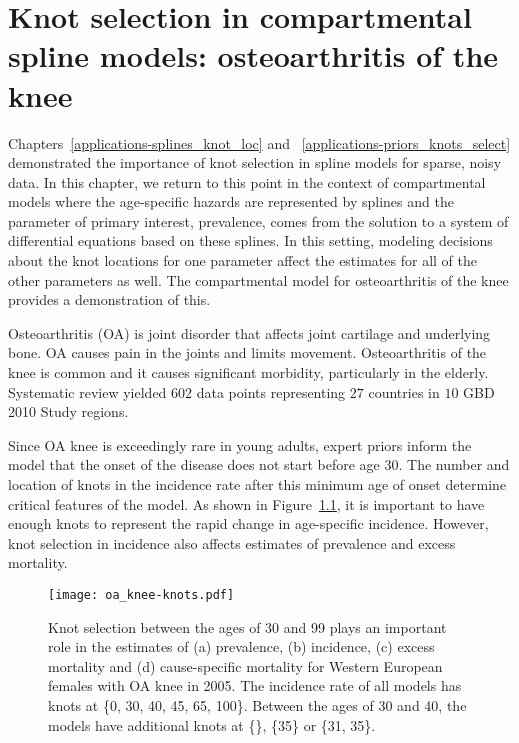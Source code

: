 \chapter{Knot selection in compartmental spline models: osteoarthritis of the knee}
\label{applications-con_fit_splines}

Chapters~\ref{applications-splines_knot_loc} and
~\ref{applications-priors_knots_select} demonstrated the importance of
knot selection in spline models for sparse, noisy data. In this
chapter, we return to this point in the context of compartmental
models where the age-specific hazards are represented by splines and
the parameter of primary interest, prevalence, comes from the solution
to a system of differential equations based on these splines. In this
setting, modeling decisions about the knot locations for one parameter
affect the estimates for all of the other parameters as well.  The
compartmental model for osteoarthritis of the knee provides a
demonstration of this.

Osteoarthritis (OA) is joint disorder that affects joint cartilage and
underlying bone.  OA causes pain in the joints and limits movement.
Osteoarthritis of the knee is common and it causes significant
morbidity, particularly in the
elderly. \cite{felson_epidemiology_1988, felson_incidence_1995}
Systematic review yielded $602$ data points representing $27$ countries
in $10$ GBD 2010 Study regions.

Since OA knee is exceedingly rare in young adults, expert priors inform the
model that the onset of the disease does not start before age 30.  The
number and location of knots in the incidence rate after this minimum
age of onset determine critical features of the model. As shown in
Figure~\ref{fig:app-oa knee knots}, it is important to have enough
knots to represent the rapid change in age-specific incidence.
However, knot selection in incidence also affects estimates of
prevalence and excess mortality.

    \begin{figure}[h]
        \begin{center}
            \texttt{[image: oa\_knee-knots.pdf]}
            \caption{Knot selection between the ages of 30 and 99
              plays an important role in the estimates of
              (a) prevalence, (b) incidence,
              (c) excess mortality and (d) cause-specific mortality
              for Western European females
              with OA knee in 2005.  The
              incidence rate of all models has knots at \{0, 30,
              40, 45, 65, 100\}.  Between the ages
              of 30 and 40, the models have additional knots at \{\}, \{35\}
              or \{31, 35\}.}
            \label{fig:app-oa knee knots}
        \end{center}
    \end{figure}

